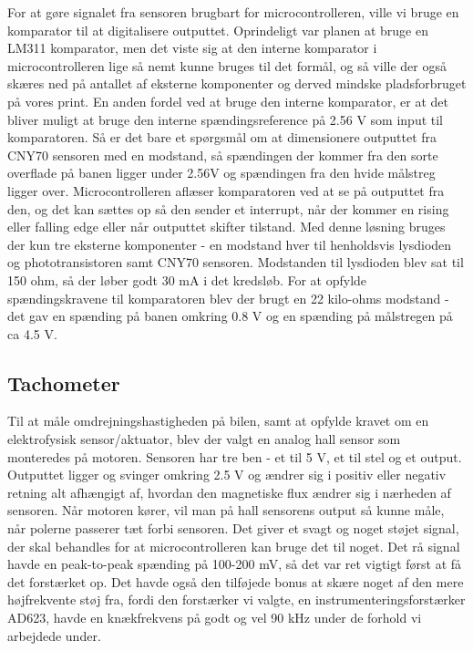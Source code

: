 For at gøre signalet fra sensoren brugbart for microcontrolleren, ville vi bruge en komparator til at digitalisere outputtet. Oprindeligt var planen at bruge en LM311 komparator, men det viste sig at den interne komparator i microcontrolleren lige så nemt kunne bruges til det formål, og så ville der også skæres ned på antallet af eksterne komponenter og derved mindske pladsforbruget på vores print. En anden fordel ved at bruge den interne komparator, er at det bliver muligt at bruge den interne spændingsreference på 2.56 V som input til komparatoren. Så er det bare et spørgsmål om at dimensionere outputtet fra CNY70 sensoren med en modstand, så spændingen der kommer fra den sorte overflade på banen ligger under 2.56V og spændingen fra den hvide målstreg ligger over. Microcontrolleren aflæser komparatoren ved at se på outputtet fra den, og det kan sættes op så den sender et interrupt, når der kommer en rising eller falling edge eller når outputtet skifter tilstand. Med denne løsning bruges der kun tre eksterne komponenter - en modstand hver til henholdsvis lysdioden og phototransistoren samt CNY70 sensoren. Modstanden til lysdioden blev sat til 150 ohm, så der løber godt 30 mA i det kredsløb. For at opfylde spændingskravene til komparatoren blev der brugt en 22 kilo-ohms modstand - det gav en spænding på banen omkring 0.8 V og en spænding på målstregen på ca 4.5 V.

\subsection{Tachometer}

Til at måle omdrejningshastigheden på bilen, samt at opfylde kravet om en elektrofysisk sensor/aktuator, blev der valgt en analog hall sensor som monteredes på motoren. Sensoren har tre ben - et til 5 V, et til stel og et output. Outputtet ligger og svinger omkring 2.5 V og ændrer sig i positiv eller negativ retning alt afhængigt af, hvordan den magnetiske flux ændrer sig i nærheden af sensoren. Når motoren kører, vil man på hall sensorens output så kunne måle, når polerne passerer tæt forbi sensoren. Det giver et svagt og noget støjet signal, der skal behandles for at microcontrolleren kan bruge det til noget. Det rå signal havde en peak-to-peak spænding på 100-200 mV, så det var ret vigtigt først at få det forstærket op. Det havde også den tilføjede bonus at skære noget af den mere højfrekvente støj fra, fordi den forstærker vi valgte, en instrumenteringsforstærker AD623, havde en knækfrekvens på godt og vel 90 kHz under de forhold vi arbejdede under. 

